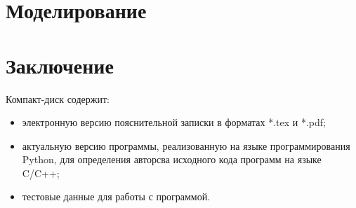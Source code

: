 \section{Моделирование}

% 
%  
%  
% 
% 
% 
% 
% 
% 
% 
% 
% 
% 
% 
% 
% 
 
 
 \newpage
\section*{Заключение}

 
 
 \newpage
 \renewcommand{\refname}{Список использованных источников}
 

 Компакт-диск содержит: 
 \begin{itemize}
 \item электронную версию пояснительной записки в форматах *.tex и *.pdf;
 \item актуальную версию программы, реализованную на языке программирования Python, для определения авторсва исходного кода программ на языке C/C++;
 \item тестовые данные для работы с программой.
 \end{itemize}
 

